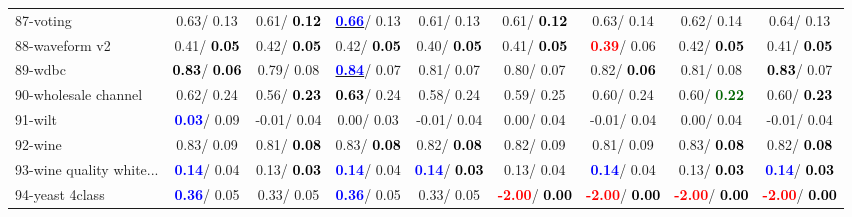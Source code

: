 \begin{table}[h]
\begin{center}
\begin{tabular}{lc|c|c|c|c|c|c|c}
87-voting &   0.63/  0.13 &   0.61/\textcolor{black}{\textbf{  0.12}} & \underline{\textcolor{blue}{\textbf{  0.66}}}/  0.13 &   0.61/  0.13 &   0.61/\textcolor{black}{\textbf{  0.12}} &   0.63/  0.14 &   0.62/  0.14 &   0.64/  0.13 \\
88-waveform v2 &   0.41/\textcolor{black}{\textbf{  0.05}} &   0.42/\textcolor{black}{\textbf{  0.05}} &   0.42/\textcolor{black}{\textbf{  0.05}} &   0.40/\textcolor{black}{\textbf{  0.05}} &   0.41/\textcolor{black}{\textbf{  0.05}} & \textcolor{red}{\textbf{  0.39}}/  0.06 &   0.42/\textcolor{black}{\textbf{  0.05}} &   0.41/\textcolor{black}{\textbf{  0.05}} \\
89-wdbc & \textcolor{black}{\textbf{  0.83}}/\textcolor{black}{\textbf{  0.06}} &   0.79/  0.08 & \underline{\textcolor{blue}{\textbf{  0.84}}}/  0.07 &   0.81/  0.07 &   0.80/  0.07 &   0.82/\textcolor{black}{\textbf{  0.06}} &   0.81/  0.08 & \textcolor{black}{\textbf{  0.83}}/  0.07 \\
90-wholesale channel &   0.62/  0.24 &   0.56/\textcolor{black}{\textbf{  0.23}} & \textcolor{black}{\textbf{  0.63}}/  0.24 &   0.58/  0.24 &   0.59/  0.25 &   0.60/  0.24 &   0.60/\textcolor{darkgreen}{\textbf{  0.22}} &   0.60/\textcolor{black}{\textbf{  0.23}} \\
91-wilt & \textcolor{blue}{\textbf{  0.03}}/  0.09 &  -0.01/  0.04 &   0.00/  0.03 &  -0.01/  0.04 &   0.00/  0.04 &  -0.01/  0.04 &   0.00/  0.04 &  -0.01/  0.04 \\
92-wine &   0.83/  0.09 &   0.81/\textcolor{black}{\textbf{  0.08}} &   0.83/\textcolor{black}{\textbf{  0.08}} &   0.82/\textcolor{black}{\textbf{  0.08}} &   0.82/  0.09 &   0.81/  0.09 &   0.83/\textcolor{black}{\textbf{  0.08}} &   0.82/\textcolor{black}{\textbf{  0.08}} \\ \hline
93-wine quality white... & \textcolor{blue}{\textbf{  0.14}}/  0.04 &   0.13/\textcolor{black}{\textbf{  0.03}} & \textcolor{blue}{\textbf{  0.14}}/  0.04 & \textcolor{blue}{\textbf{  0.14}}/\textcolor{black}{\textbf{  0.03}} &   0.13/  0.04 & \textcolor{blue}{\textbf{  0.14}}/  0.04 &   0.13/\textcolor{black}{\textbf{  0.03}} & \textcolor{blue}{\textbf{  0.14}}/\textcolor{black}{\textbf{  0.03}} \\
94-yeast 4class & \textcolor{blue}{\textbf{  0.36}}/  0.05 &   0.33/  0.05 & \textcolor{blue}{\textbf{  0.36}}/  0.05 &   0.33/  0.05 & \textcolor{red}{\textbf{ -2.00}}/\textcolor{black}{\textbf{  0.00}} & \textcolor{red}{\textbf{ -2.00}}/\textcolor{black}{\textbf{  0.00}} & \textcolor{red}{\textbf{ -2.00}}/\textcolor{black}{\textbf{  0.00}} & \textcolor{red}{\textbf{ -2.00}}/\textcolor{black}{\textbf{  0.00}} \\\end{tabular}\label{stratsALCKappa2bCIELM}
\end{center}
\end{table}